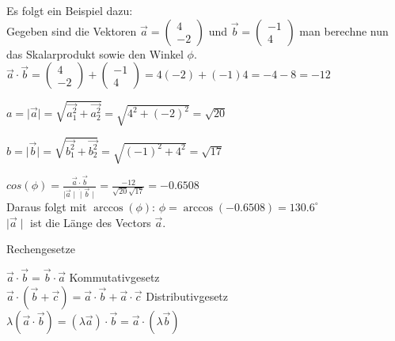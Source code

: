 Es folgt ein Beispiel dazu:\\
Gegeben sind die Vektoren 
$\vec{a} = \begin{pmatrix} 4 \\ -2 \end{pmatrix}$
und
$\vec{b} = \begin{pmatrix} -1 \\ 4 \end{pmatrix}$
man berechne nun das Skalarprodukt sowie den Winkel $\phi$.\\

\begin{math}
	\vec{a} \cdot \vec{b} = 
	\begin{pmatrix} 4 \\ -2 \end{pmatrix} + 
	\begin{pmatrix} -1 \\ 4 \end{pmatrix} =
	4 (-2) + (-1) 4 = -4 -8 = -12
\end{math}

\begin{math}
	a = \mid \vec{a} \mid = 
	\sqrt{\vec{a_{1}^2} + \vec{a_{2}^2}} =
	\sqrt{4^2 + (-2)^2} =
	\sqrt{20}
\end{math}

\begin{math}
	b = \mid \vec{b} \mid = 
	\sqrt{\vec{b_{1}^2} + \vec{b_{2}^2}} =
	\sqrt{(-1)^2 + 4^2} =
	\sqrt{17}
\end{math}

\begin{math}
	cos(\phi) =
	\frac{\vec{a} \cdot \vec{b}}{\mid \vec{a} \mid \dot \mid \vec{b} \mid} = 
	\frac{-12}{\sqrt{20} \sqrt{17}} = 
	-0.6508
\end{math}
\\Daraus folgt mit $\arccos(\phi)$:
\begin{math}
	\phi = \arccos(-0.6508) = 130.6^\circ
\end{math}
\\$\mid \vec{a} \mid$ ist die Länge des Vectors $\vec{a}$.

\begin{description}
	\item[Rechengesetze]
\end{description}
$\vec{a} \cdot \vec{b} = \vec{b} \cdot \vec{a}$ Kommutativgesetz\\
$\vec{a} \cdot (\vec{b} + \vec{c}) = 
\vec{a} \cdot \vec{b} + \vec{a} \cdot \vec{c}$
Distributivgesetz\\
$\lambda (\vec{a} \cdot \vec{b}) = 
(\lambda \vec{a}) \cdot \vec{b} = 
\vec{a} \cdot (\lambda \vec{b})$

